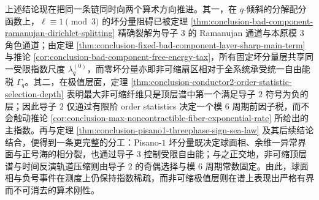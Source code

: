 

上述结论现在把同一条链同时向两个算术方向推进。其一，在 \(q\)-倾斜的分解配分函数上，\(\ell\equiv 1\pmod 3\) 的坏分量阻碍已被定理 \ref{thm:conclusion-bad-component-ramanujan-dirichlet-splitting} 精确裂解为导子 \(3\) 的 Ramanujan 通道与本原模 \(3\) 角色通道；由定理 \ref{thm:conclusion-fixed-bad-component-layer-sharp-main-term} 与推论 \ref{cor:conclusion-bad-component-free-energy-tax}，所有固定坏分量层共享同一受限指数尺度 \(\lambda_q^{(0)}\)，而零坏分量亦即非可缩扇区相对于全系统承受统一自由能税 \(\Gamma_q\)。其二，在极值层面，定理 \ref{thm:conclusion-conductor2-order-statistic-selection-depth} 表明最大非可缩纤维只是顶层谱中第一个满足导子 \(2\) 符号为负的层；因此导子 \(2\) 仅通过有限阶 order statistics 决定一个模 \(6\) 周期前因子税，而不会触动推论 \ref{cor:conclusion-max-noncontractible-fiber-exponential-rate} 所给出的主指数。再与定理 \ref{thm:conclusion-pisano1-threephase-sign-sea-law} 及其后续结论结合，便得到一条更完整的分工：Pisano-\(1\) 坏分量既决定球面相、余维一异常界面与正号海的相分裂，也通过导子 \(3\) 控制受限自由能；与之正交地，非可缩顶层谱与时间反演轨道压缩则由导子 \(2\) 的奇偶选择与模 \(6\) 周期常数固定。由此，球面相与负号事件在测度上仍保持指数稀疏，而非可缩极值层则在谱上表现出严格有界而不可消去的算术刚性。

\endinput
